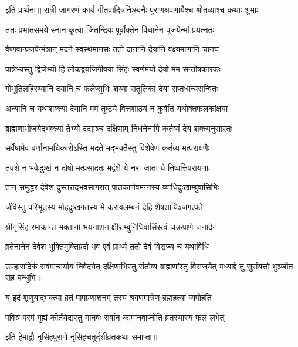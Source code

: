 इति प्रार्थना॥
\twolineshloka
{रात्री जागरणं कार्य गीतवादित्रनिःस्वनैः}
{पुराणश्रवणायैश्च श्रोतव्याश्च कथाः शुभाः} %

\twolineshloka
{ततः प्रभातसमये स्नान कृत्वा जितन्द्रियः}
{पूर्वोक्तेन विधानेन पूजयेन्मां प्रयत्नतः} %

\twolineshloka
{वैष्णवान्प्रजपेन्मंत्रान् मदने स्वस्थमानसः}
{ततो दानानि देयानि वक्ष्यमाणानि चानघ} %

\twolineshloka
{पात्रेभ्यस्तु द्विजेभ्यो हि लोकद्वयजिगीषया}
{सिंहः स्वर्णमयो देयो मम सन्तोषकारकः} %

\twolineshloka
{गोभूतिलहिरण्यानि दयानि च फलेप्सुभिः}
{शय्या सतूलिका देया सप्तधान्यसन्वितः} %

\twolineshloka
{अन्यानि च यथाशक्त्या देयानि मम तुष्टये}
{वित्तशाठयं न कुर्वीत यथोक्तफलकांक्षया} %

\twolineshloka
{ब्राह्मणाभोजयेद्भक्त्या तेभ्यो दद्याञ्च दक्षिणाम्}
{निर्धनेनापि कर्तव्यं देय शक्त्यनुसारतः} %


\twolineshloka
{सर्वेषामेव वर्णानामधिकारोऽस्ति मदते}
{मद्भक्तैस्तु विशेषेण कर्तव्य मत्परायणैः} %


\twolineshloka
{तवशे न भवेःदुःखं न दोषो मत्प्रसादतः}
{मद्वंशे ये नरा जाता ये निष्पत्तिपरायणाः} %


\twolineshloka
{तान् समुद्धर देवेश दुस्तराद्भवसागरात्}
{पातकार्णवमग्नस्य व्याधिदुःखाम्बुवासिभिः} %


\twolineshloka
{जीवैस्तु परिभूतस्य मोहदुःखगतस्य मे}
{करावलम्बनं देहि शेषशायिञ्जगत्पते} %


\twolineshloka
{श्रीनृसिंह रमाकान्त भक्तानां भयनाशन}
{क्षीराम्बुनिधिवासिंस्त्वं चक्रपाणे जनार्दन} %


\twolineshloka
{व्रतेनानेन देवेश भुक्तिमुक्तिप्रदो भव}
{एवं प्रार्थ्य ततो देवं विसृज्य च यथाविधि} %

\threelineshloka
{उपहारादिकं सर्वमाचार्याय निवेदयेत्}
{दक्षिणाभिस्तु संतोष्य ब्राह्मणांस्तु विसजयेत्} %
{मध्याद्दे तु सुसंयत्तो भुञ्जीत सह बन्धुभिः॥}

\twolineshloka
{य इदं शृणुयाद्भक्त्या व्रतं पापप्रणाशनम्}
{तस्य श्रवणमात्रेण ब्रह्महत्या व्यपोहति} %

\twolineshloka
{पवित्रं परमं गुह्यं कीर्तयेद्यस्तु मानवः}
{सर्वान् कामानवाप्नोति व्रतस्यास्य फलं लभेत्}

इति हेमाद्रौ नृसिंहपुराणे नृसिंहचतुर्दशीव्रतकथा समाप्ता॥

